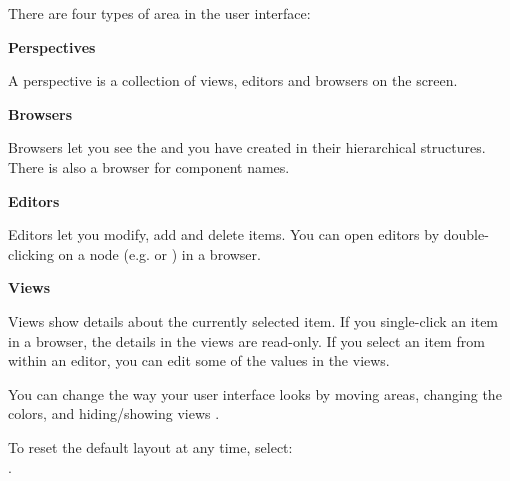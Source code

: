
There are four types of area in the user interface:
\bigskip

\textbf{Perspectives}

A perspective is a collection of views, editors and browsers on the screen. 

\textbf{Browsers}

Browsers let you see the \gdcases{} and \gdsuites{} you have created in their hierarchical structures. There is also a browser for component names. 

\textbf{Editors}

Editors let you modify, add and delete items. You can open editors by double-clicking on a node (e.g. \gdsuite{} or \gdcase{}) in a browser. 

\textbf{Views}

Views show details about the currently selected item. If you single-click an item in a browser, the details in the views are read-only. If you select an item from within an editor, you can edit some of the values in the views.  

\bigskip

You can change the way your user interface looks by moving areas, changing the colors, and hiding/showing views . 

To reset the default layout at any time, select:\\
.



